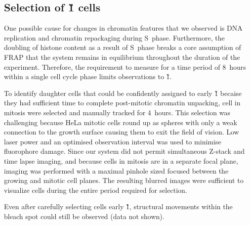     \subsection{Selection of \G1{} cells}

    One possible cause for changes in chromatin features that we observed
    is DNA replication and chromatin repackaging during S~phase. 
    Furthermore, the doubling of histone content as a result of S~phase breaks
    a core assumption of FRAP that the system remains in equilibrium
    throughout the duration of the experiment.
    Therefore, the requirement to measure for a time period of 8~hours 
    within a single cell cycle phase limits observations to \G1{}.

    To identify daughter cells that could be confidently assigned to early \G1{}
    becaise they had sufficient time to complete post-mitotic chromatin unpacking,
    cell in mitosis were selected and manually tracked for 4~hours.
    This selection was challenging because HeLa mitotic cells round up
    as spheres with only a weak connection to the growth surface
    causing them to exit the field of vision.
    Low laser power and an optimised observation interval 
    was used to minimise fluorophore damage.
    Since our system did not permit simultaneous Z-stack and time lapse imaging, 
    and because cells in mitosis are in a separate focal plane,
    imaging was performed with a maximal pinhole sized focused 
    between the growing and mitotic cell planes.
    The resulting blurred images were sufficient to visualize cells during
    the entire period required for selection.

    Even after carefully selecting cells early \G1{},
    structural movements within the bleach spot could still be observed (data not shown).



